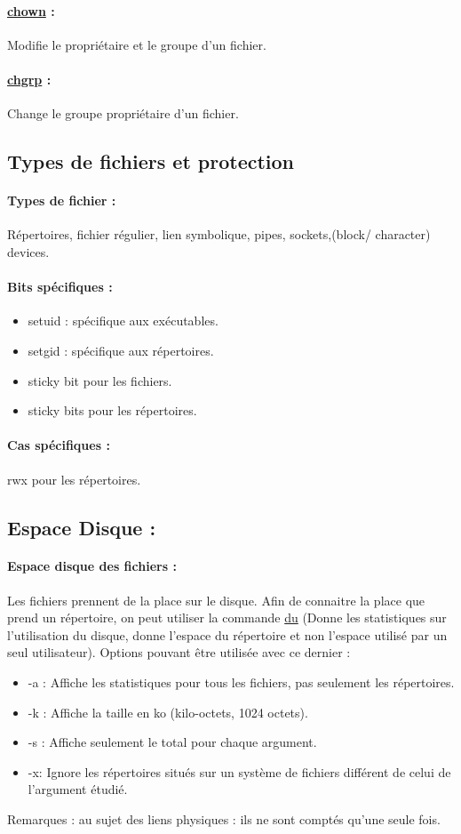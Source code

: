 \documentclass{article}[12pt]
\begin{document}
\paragraph{\href{http://jp.barralis.com/linux-man/man1/chown.1.php}{chown} : } Modifie le propriétaire et le groupe d'un fichier.
\paragraph{\href{http://jp.barralis.com/linux-man/man1/chgrp.1.php}{chgrp} : }  Change le groupe propriétaire d'un fichier. 
\subsection{Types de fichiers et protection}
\paragraph{Types de fichier : } Répertoires, fichier régulier, lien symbolique, pipes, sockets,(block/ character) devices.
\paragraph{Bits spécifiques : }
\begin{itemize}
\item setuid : spécifique aux exécutables.
\item setgid : spécifique aux répertoires.
\item sticky bit pour les fichiers.
\item sticky bits pour les répertoires.
\end{itemize}
\paragraph{Cas spécifiques : } rwx pour les répertoires.
\subsection{ Espace Disque : }
\paragraph{Espace disque des fichiers : } Les fichiers prennent de la place sur le disque. Afin de connaitre la place que prend un répertoire, on peut utiliser la commande \href{http://jp.barralis.com/linux-man/man1/du.1.php}{du} (Donne les statistiques sur l'utilisation du disque, donne l'espace du répertoire et non l'espace utilisé par un seul utilisateur). Options pouvant être utilisée avec ce dernier :
\begin{itemize}
\item -a : Affiche les statistiques pour tous les fichiers, pas seulement les répertoires.
\item -k : Affiche la taille en ko (kilo-octets, 1024 octets).
\item -s : Affiche seulement le total pour chaque argument.
\item -x: Ignore les répertoires situés sur un système de fichiers différent de celui de l'argument étudié.
\end{itemize}
Remarques : au sujet des liens physiques : ils ne sont comptés qu'une seule fois.
\end{document}
